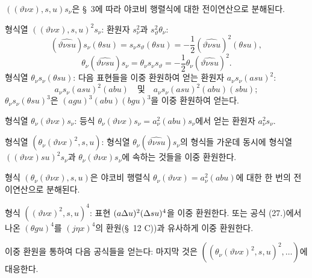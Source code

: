 $((\vartheta \nu x),s,u)s_\nu$은 \S\ 3에 따라 야코비 행렬식에 대한 전이연산으로 분해된다.

형식열 $((\vartheta \nu x),s,u)^2s_\nu$: 환원자 $s_\nu^2$과 $s_\vartheta^2\theta_\nu$:
\[
(\widehat{\vartheta \nu su})s_\nu(\theta su)=s_\nu s_\vartheta(\theta su)=-\frac12(\widehat{\vartheta \nu su})^2(\theta su),
\]
\[
\theta_\nu(\widehat{\vartheta \nu su})s_\nu=\theta_\nu s_\nu s_\vartheta=-\frac12\theta_\nu(\widehat{\vartheta \nu su})^2.
\]
형식열 $\theta_\nu s_\nu(\theta su)$: 다음 표현들을 이중 환원하여 얻는 환원자 $a_\nu s_\nu(asu)^2$:
\[
a_\nu s_\nu(asu)^2(abu)\quad\text{및}\quad a_\nu s_\nu(asu)^2(abu)(sbu);
\]
$\theta_\nu s_\nu(\theta su)^3$은 $(agu)^3(abu)(bgu)^3$을 이중 환원하여 얻는다.

형식열 $\theta_\nu(\vartheta \nu x)s_\nu$: 등식 $\theta_\nu(\vartheta \nu x)s_\nu=a_\nu^2(abu)s_\nu$에서 얻는 환원자 $a_\nu^2s_\nu$.

형식열 $(\theta_\nu(\vartheta \nu x)^2,s,u)$: 형식열 $\theta_\nu(\widehat{\vartheta \nu su})s_\nu$의 형식들 가운데 동시에 형식열 $((\vartheta \nu x)su)^2s_\nu$과 $\theta_\nu(\vartheta \nu x)s_\nu$에 속하는 것들을 이중 환원한다.

형식 $(\theta_\nu(\vartheta \nu x),s,u)$은 야코비 행렬식 $\theta_\nu(\vartheta \nu x)=a_\nu^2(abu)$에 대한 한 번의 전이연산으로 분해된다.

형식 $((\vartheta \nu x)^2,s,u)^4$: 표현 $(a\Delta u)^2(\Delta su)^4$을 이중 환원한다. 또는 공식 (27.)에서 나온 $(\theta gu)^4$를 $(j\eta x)^4$의 환원(\S\ 12 C))과 유사하게 이중 환원한다.

이중 환원을 통하여 다음 공식들을 얻는다:
마지막 것은 $((\theta_\nu(\vartheta \nu x)^2,s,u)^2,\ldots)$에 대응한다.

